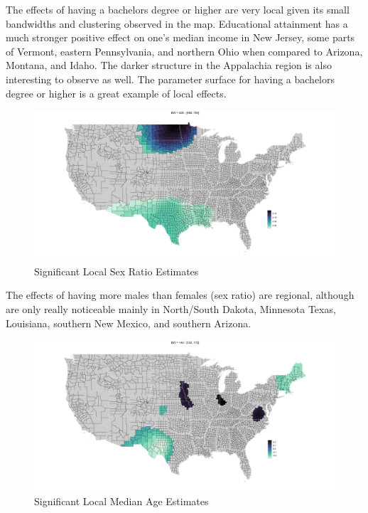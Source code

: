 \documentclass[
]{article}
\begin{document}
The effects of having a bachelors degree or higher are very local given
its small bandwidths and clustering observed in the map. Educational
attainment has a much stronger positive effect on one's median income in
New Jersey, some parts of Vermont, eastern Pennsylvania, and northern
Ohio when compared to Arizona, Montana, and Idaho. The darker structure
in the Appalachia region is also interesting to observe as well. The
parameter surface for having a bachelors degree or higher is a great
example of local effects.

\begin{figure}[H]

{\centering \includegraphics[width=1\linewidth]{images/local-param/sig-sex-ratio} 

}

\caption{Significant Local Sex Ratio Estimates}\label{fig:unnamed-chunk-17}
\end{figure}

The effects of having more males than females (sex ratio) are regional,
although are only really noticeable mainly in North/South Dakota,
Minnesota Texas, Louisiana, southern New Mexico, and southern Arizona.

\begin{figure}[H]

{\centering \includegraphics[width=1\linewidth]{images/local-param/sig-median-age} 

}

\caption{Significant Local Median Age Estimates}\label{fig:unnamed-chunk-18}
\end{figure}
\end{document}
